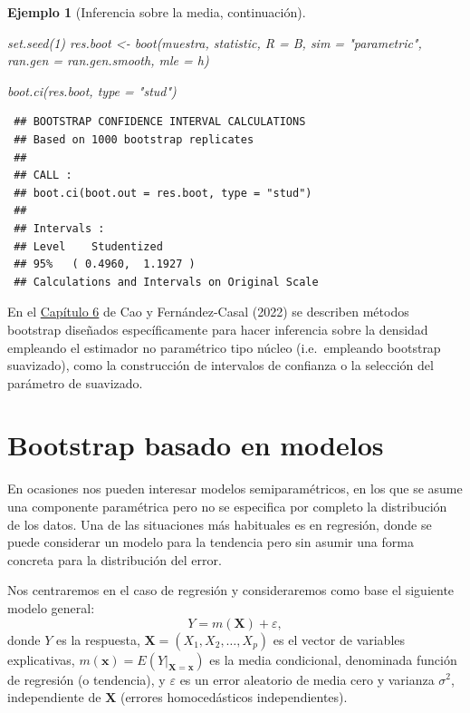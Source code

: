 \documentclass[
]{book}
\newenvironment{Shaded}{\begin{snugshade}}{\end{snugshade}}
\newcommand{\AttributeTok}[1]{\textcolor[rgb]{0.77,0.63,0.00}{#1}}
\newcommand{\DecValTok}[1]{\textcolor[rgb]{0.00,0.00,0.81}{#1}}
\newcommand{\FunctionTok}[1]{\textcolor[rgb]{0.00,0.00,0.00}{#1}}
\newcommand{\NormalTok}[1]{#1}
\newcommand{\OtherTok}[1]{\textcolor[rgb]{0.56,0.35,0.01}{#1}}
\newcommand{\StringTok}[1]{\textcolor[rgb]{0.31,0.60,0.02}{#1}}
\theoremstyle{break}
\newtheorem{example}{Ejemplo}[chapter]
\theoremstyle{nonumberplain}
\begin{document}
\begin{example}[Inferencia sobre la media, continuación]
\begin{Shaded}
\begin{Highlighting}[]
\FunctionTok{set.seed}\NormalTok{(}\DecValTok{1}\NormalTok{)}
\NormalTok{res.boot }\OtherTok{\textless{}{-}} \FunctionTok{boot}\NormalTok{(muestra, statistic, }\AttributeTok{R =}\NormalTok{ B, }\AttributeTok{sim =} \StringTok{"parametric"}\NormalTok{,}
                 \AttributeTok{ran.gen =}\NormalTok{ ran.gen.smooth, }\AttributeTok{mle =}\NormalTok{ h)}

\FunctionTok{boot.ci}\NormalTok{(res.boot, }\AttributeTok{type =} \StringTok{"stud"}\NormalTok{)}
\end{Highlighting}
\end{Shaded}

\begin{verbatim}
 ## BOOTSTRAP CONFIDENCE INTERVAL CALCULATIONS
 ## Based on 1000 bootstrap replicates
 ## 
 ## CALL : 
 ## boot.ci(boot.out = res.boot, type = "stud")
 ## 
 ## Intervals : 
 ## Level    Studentized     
 ## 95%   ( 0.4960,  1.1927 )  
 ## Calculations and Intervals on Original Scale
\end{verbatim}

\end{example}

En el \href{https://rubenfcasal.github.io/book_remuestreo/npden.html}{Capítulo 6} de Cao y Fernández-Casal (2022) se describen métodos bootstrap diseñados específicamente para hacer inferencia sobre la densidad empleando el estimador no paramétrico tipo núcleo (i.e.~empleando bootstrap suavizado), como la construcción de intervalos de confianza o la selección del parámetro de suavizado.

\hypertarget{boot-reg}{%
\section{Bootstrap basado en modelos}\label{boot-reg}}

En ocasiones nos pueden interesar modelos semiparamétricos, en los que se asume una componente paramétrica pero no se especifica por completo la distribución de los datos.
Una de las situaciones más habituales es en regresión, donde se puede considerar un modelo para la tendencia pero sin asumir una forma concreta para la distribución del error.

Nos centraremos en el caso de regresión y consideraremos como base el siguiente modelo general:
\begin{equation} 
  Y = m(\mathbf{X}) + \varepsilon,
  \label{eq:modelogeneral}
\end{equation}
donde \(Y\) es la respuesta, \(\mathbf{X}=(X_1, X_2, \ldots, X_p)\) es el vector de variables explicativas, \(m(\mathbf{x}) = E\left( \left. Y\right\vert_{\mathbf{X}=\mathbf{x}} \right)\) es la media condicional, denominada función de regresión (o tendencia), y \(\varepsilon\) es un error aleatorio de media cero y varianza \(\sigma^2\), independiente de \(\mathbf{X}\) (errores homocedásticos independientes).
\end{document}
